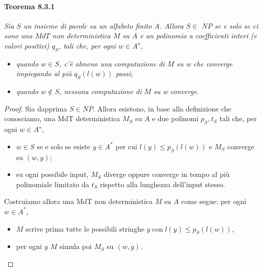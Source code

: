 \paragraph{Teorema 8.3.1} \textit{Sia $S$ un insieme di parole su un alfabeto finito A.
    Allora $S \in$ $N P$ se e solo se ci sono una $M d T$ non deterministica $M$ su
    $A$ e un polinomio a coefficienti interi (e valori positivi) $q_S$, tali che, per
    ogni $w \in A^{\star}$,}
\begin{itemize}
    \item \textit{quando $w \in S$, c'è almeno una computazione di $M$ su w che converge
              impiegando al più $q_S(l(w))$ passi;}
    \item \textit{quando $w \notin S$, nessuna computazione di $M$ su w converge.}
\end{itemize}
\begin{proof}
    Sia dapprima $S \in N P$. Allora esistono, in base alla definizione che
    conosciamo, una MdT deterministica $M_S$ su $A$ e due polinomi $p_S, t_S$
    tali che, per ogni $w \in A^{\star}$,
    \begin{itemize}
        \item $w \in S$ se e solo se esiste $y \in A^*$ per cui $l(y) \leq
                  p_S(l(w))$ e $M_S$ converge su $(w, y)$;
        \item su ogni possibile input, $M_S$ diverge oppure converge in tempo al
              più polinomiale limitato da $t_S$ rispetto alla lunghezza dell'input
              stesso.
    \end{itemize}

    Costruiamo allora una MdT non deterministica $M$ su $A$ come segue: per ogni
    $w \in A^*$,
    \begin{itemize}
        \item $M$ scrive prima tutte le possibili stringhe $y \operatorname{con}
                  l(y) \leq p_S(l(w))$,
        \item per ogni $y$ $M$ simula poi $M_S$ su $(w, y)$.
    \end{itemize}


\end{proof}

